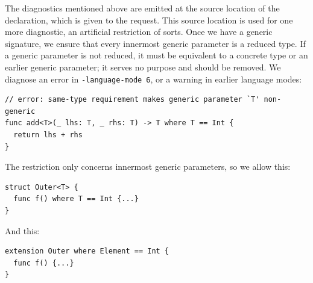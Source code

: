 \documentclass[../generics]{subfiles}
\begin{document}
The diagnostics mentioned above are emitted at the source location of the declaration, which is given to the request. This source location is used for one more diagnostic, an artificial restriction of sorts. Once we have a generic signature, we ensure that every innermost generic parameter is a reduced type. If a generic parameter is not reduced, it must be equivalent to a concrete type or an earlier generic parameter; it serves no purpose and should be removed. We diagnose an error in \texttt{-language-mode 6}, or a warning in earlier language modes:
\begin{Verbatim}
// error: same-type requirement makes generic parameter `T' non-generic
func add<T>(_ lhs: T, _ rhs: T) -> T where T == Int {
  return lhs + rhs
}
\end{Verbatim}
The restriction only concerns innermost generic parameters, so we allow this:
\begin{Verbatim}
struct Outer<T> {
  func f() where T == Int {...}
}
\end{Verbatim}
And this:
\begin{Verbatim}
extension Outer where Element == Int {
  func f() {...}
}
\end{Verbatim}

\begin{figure}\label{abstract generic signature request figure}
\begin{center}
\end{center}
\end{figure}
\end{document}
